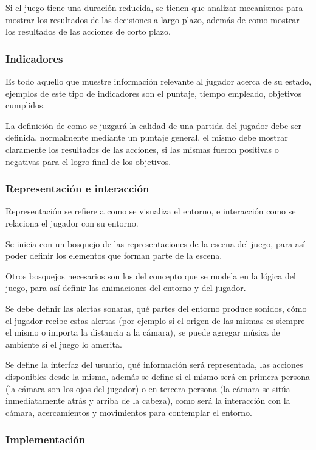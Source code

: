 Si el juego tiene una duración reducida, se tienen que analizar mecanismos para mostrar los resultados de las decisiones a largo plazo, además de como mostrar los resultados de las acciones de corto plazo.

\subsubsection{Indicadores}

Es todo aquello que muestre información relevante al jugador acerca de su estado, ejemplos de este tipo de indicadores son el puntaje, tiempo empleado, objetivos cumplidos. 

La definición de como se juzgará la calidad de una partida del jugador debe ser definida, normalmente mediante un puntaje general, el mismo debe mostrar claramente los resultados de las acciones, si las mismas fueron positivas o negativas para el logro final de los objetivos.

\subsubsection{Representación e interacción}

Representación se refiere a como se visualiza el entorno, e interacción como se relaciona el jugador con su entorno.

Se inicia con un bosquejo de las representaciones de la escena del juego, para así poder definir los elementos que forman parte de la escena.

Otros bosquejos necesarios son los del concepto que se modela en la lógica del juego, para así definir las animaciones del entorno y del jugador.

Se debe definir las alertas sonaras, qué partes del entorno produce sonidos, cómo el jugador recibe estas alertas (por ejemplo si el origen de las mismas es siempre el mismo o importa la distancia a la cámara), se puede agregar música de ambiente si el juego lo amerita.

Se define la interfaz del usuario, qué información será representada, las acciones disponibles desde la misma, además se define si el mismo será en primera persona (la cámara son los ojos del jugador) o en tercera persona (la cámara se sitúa inmediatamente atrás y arriba de la cabeza), como será la interacción con la cámara, acercamientos y movimientos para contemplar el entorno.

\subsubsection{Implementación} 


